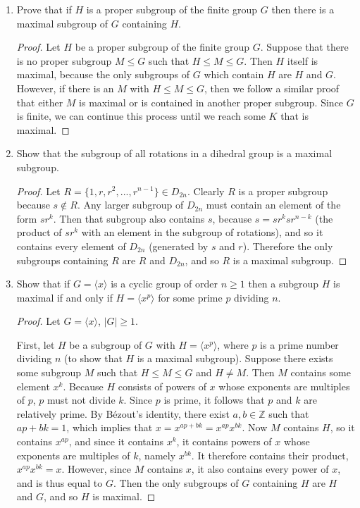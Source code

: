 \documentclass{article}
\begin{document}
\begin{enumerate}[label=(\alph*), itemsep=0em]
    \item Prove that if $H$ is a proper subgroup of the finite group $G$ then there is a maximal subgroup of $G$ containing $H$.
          \begin{proof}
            Let $H$ be a proper subgroup of the finite group $G$. Suppose that there is no proper subgroup $M \leq G$ such that $H \leq M \leq G$. Then $H$ itself is maximal, because the only subgroups of $G$ which contain $H$ are $H$ and $G$. However, if there is an $M$ with $H \leq M \leq G$, then we follow a similar proof that either $M$ is maximal or is contained in another proper subgroup. Since $G$ is finite, we can continue this process until we reach some $K$ that is maximal.
          \end{proof}
    \item Show that the subgroup of all rotations in a dihedral group is a maximal subgroup.
          \begin{proof}
            Let $R = \{ 1, r, r^2, ..., r^{n - 1} \} \in D_{2n}$. Clearly $R$ is a proper subgroup because $s \notin R$. Any larger subgroup of $D_{2n}$ must contain an element of the form $sr^k$. Then that subgroup also contains $s$, because $s = sr^k sr^{n - k}$ (the product of $sr^k$ with an element in the subgroup of rotations), and so it contains every element of $D_{2n}$ (generated by $s$ and $r$). Therefore the only subgroups containing $R$ are $R$ and $D_{2n}$, and so $R$ is a maximal subgroup.
          \end{proof}
    \item Show that if $G = \langle x \rangle$ is a cyclic group of order $n \geq 1$ then a subgroup $H$ is maximal if and only if $H = \langle x^p \rangle$ for some prime $p$ dividing $n$.
          \begin{proof}
            Let $G = \langle x \rangle$, $|G| \geq 1$.

            First, let $H$ be a subgroup of $G$ with $H = \langle x^p \rangle$, where $p$ is a prime number dividing $n$ (to show that $H$ is a maximal subgroup). Suppose there exists some subgroup $M$ such that $H \leq M \leq G$ and $H \neq M$. Then $M$ contains some element $x^k$. Because $H$ consists of powers of $x$ whose exponents are multiples of $p$, $p$ must not divide $k$. Since $p$ is prime, it follows that $p$ and $k$ are relatively prime. By Bézout's identity, there exist $a, b \in \mathbb{Z}$ such that $ap + bk = 1$, which implies that $x = x^{ap + bk} = x^{ap}x^{bk}$. Now $M$ contains $H$, so it contains $x^{ap}$, and since it contains $x^k$, it contains powers of $x$ whose exponents are multiples of $k$, namely $x^{bk}$. It therefore contains their product, $x^{ap}x^{bk} = x$. However, since $M$ contains $x$, it also contains every power of $x$, and is thus equal to $G$. Then the only subgroups of $G$ containing $H$ are $H$ and $G$, and so $H$ is maximal.


\end{proof}
\end{enumerate}
\end{document}
